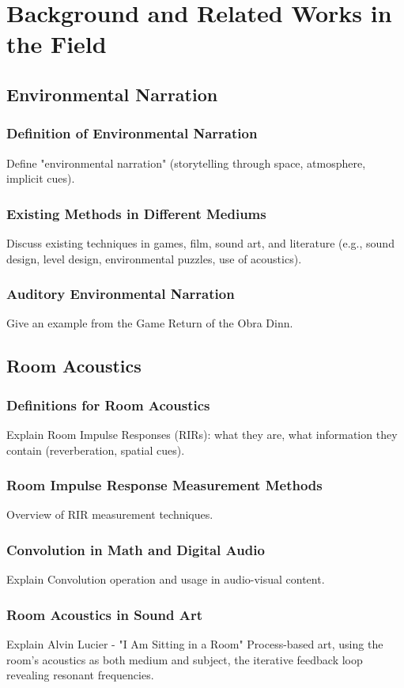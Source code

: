 \chapter{Background and Related Works in the Field}
    \section{Environmental Narration}
        \subsection{Definition of Environmental Narration} Define "environmental narration" (storytelling through space, atmosphere, implicit cues).
        \subsection{Existing Methods in Different Mediums} Discuss existing techniques in games, film, sound art, and literature (e.g., sound design, level design, environmental puzzles, use of acoustics).
        \subsection{Auditory Environmental Narration} Give an example from the Game Return of the Obra Dinn. 
    \section{Room Acoustics}
        \subsection{Definitions for Room Acoustics} Explain Room Impulse Responses (RIRs): what they are, what information they contain (reverberation, spatial cues).
        \subsection{Room Impulse Response Measurement Methods} Overview of RIR measurement techniques.
        \subsection{Convolution in Math and Digital Audio} Explain Convolution operation and usage in audio-visual content.
        \subsection{Room Acoustics in Sound Art} Explain Alvin Lucier - "I Am Sitting in a Room" Process-based art, using the room's acoustics as both medium and subject, the iterative feedback loop revealing resonant frequencies.
